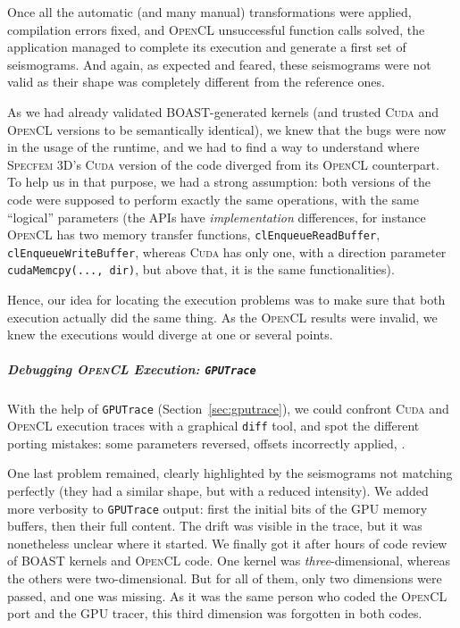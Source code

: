 \documentclass[11pt, a4paper, twoside]{montblanc}
\newcommand{\productname}[1]{\textsc{#1}}
\newcommand{\Specfem}{\productname{Specfem 3D}\xspace}
\newcommand{\Cuda}{\productname{Cuda}\xspace}
\newcommand{\OCL}{\productname{OpenCL}\xspace}
\newcommand{\code}[1]{\texttt{#1}}
\begin{document}
Once all the automatic (and many manual) transformations were applied,
compilation errors fixed, and \OCL unsuccessful function calls solved,
the application managed to complete its execution and generate a first
set of seismograms. And again, as expected and feared, these
seismograms were not valid as their shape was completely different from the
reference ones.

As we had already validated BOAST-generated kernels (and trusted \Cuda and \OCL
versions to be semantically identical), we knew that the bugs were now in the
usage of the runtime, and we had to find a way to understand where \Specfem's
\Cuda version of the code diverged from its \OCL counterpart. To help us in
that purpose, we had a strong assumption: both versions of the code were
supposed to perform exactly the same operations, with the same ``logical''
parameters (the APIs have \emph{implementation} differences, for instance \OCL
has two memory transfer functions, \code{clEnqueueReadBuffer},
\code{clEnqueueWriteBuffer}, whereas \Cuda has only one, with a direction
parameter \code{cudaMemcpy(..., dir)}, but above that, it is the same
functionalities).

Hence, our idea for locating the execution problems was to make sure
that both execution actually did the same thing. As the \OCL results
were invalid, we knew the executions would diverge at one or several
points.

\subparagraph{Debugging \OCL Execution: \code{GPUTrace}} 

With the help of \code{GPUTrace} (Section~\ref{sec:gputrace}), we
could confront \Cuda and \OCL execution traces with a graphical
\code{diff} tool, and spot the different porting mistakes: some
parameters reversed, offsets incorrectly applied, \etc{}. 

One last problem remained, clearly highlighted by the seismograms not
matching perfectly (they had a similar shape, but with a reduced
intensity). We added more verbosity to \code{GPUTrace} output: first
the initial bits of the GPU memory buffers, then their full
content. The drift was visible in the trace, but it was nonetheless
unclear where it started. We finally got it after hours of code review
of BOAST kernels and \OCL code. One kernel was
\emph{three}-dimensional, whereas the others were two-dimensional. But
for all of them, only two dimensions were passed, and one was
missing. As it was the same person who coded the \OCL port and the GPU
tracer, this third dimension was forgotten in both codes.
\end{document}

